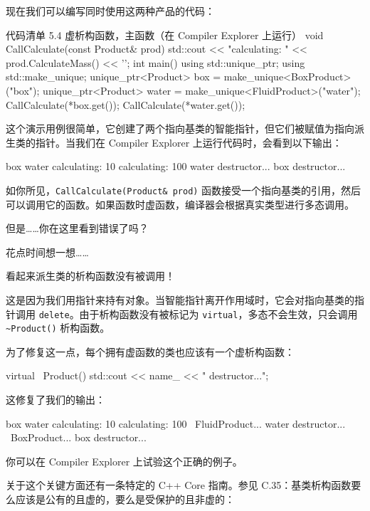现在我们可以编写同时使用这两种产品的代码：

\begin{codeboxt}[cpp]{代码清单 5.4 虚析构函数，主函数（在 Compiler Explorer 上运行）}
void CallCalculate(const Product& prod) {
std::cout << "calculating: " << prod.CalculateMass() << '\n';
}
int main() {
using std::unique_ptr;
using std::make_unique;
unique_ptr<Product> box = make_unique<BoxProduct>("box");
unique_ptr<Product> water = make_unique<FluidProduct>("water");
CallCalculate(*box.get());
CallCalculate(*water.get());
}
\end{codeboxt}

这个演示用例很简单，它创建了两个指向基类的智能指针，但它们被赋值为指向派生类的指针。当我们在 Compiler Explorer 上运行代码时，会看到以下输出：

\begin{codebox}[cpp]
box
water
calculating: 10
calculating: 100
water destructor...
box destructor...
\end{codebox}

如你所见，\texttt{CallCalculate(Product\& prod)} 函数接受一个指向基类的引用，然后可以调用它的函数。如果函数时虚函数，编译器会根据真实类型进行多态调用。

但是……你在这里看到错误了吗？

花点时间想一想……

看起来派生类的析构函数没有被调用！

这是因为我们用指针来持有对象。当智能指针离开作用域时，它会对指向基类的指针调用 \texttt{delete}。由于析构函数没有被标记为 \texttt{virtual}，多态不会生效，只会调用 \texttt{\textasciitilde Product()} 析构函数。

为了修复这一点，每个拥有虚函数的类也应该有一个虚析构函数：

\begin{codebox}[cpp]
virtual ~Product() {
std::cout << name_ << " destructor...\n";
}
\end{codebox}

这修复了我们的输出：

\begin{codebox}[cpp]
box
water
calculating: 10
calculating: 100
~FluidProduct...
water destructor...
~BoxProduct...
box destructor...
\end{codebox}

你可以在 Compiler Explorer 上试验这个正确的例子。

关于这个关键方面还有一条特定的 C++ Core 指南。参见 C.35：基类析构函数要么应该是公有的且虚的，要么是受保护的且非虚的：

